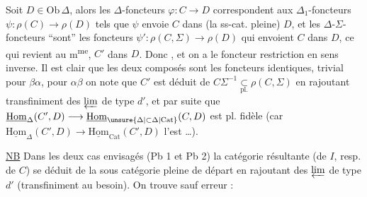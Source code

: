 
Soit $D\in\mathrm{Ob}\,\Delta$, alors les $\Delta$-foncteurs $\varphi:C\longrightarrow D$ correspondent aux $\Delta_1$-foncteurs $\psi:\rho(C)\longrightarrow\rho(D)$ tels que $\psi$ envoie $C$ dans (la ss-cat. pleine) $D$, et les $\Delta$-$\Sigma$-foncteurs ``sont''  les foncteurs $\psi':\rho(C,\Sigma)\longrightarrow\rho(D)$  qui envoient $C$ dans $D$,  ce qui revient au m\textsuperscript{me}, $C'$ dans $D$. Donc
, et on a le foncteur restriction en sens inverse. Il est clair que les deux composés sont \inserted{$\simeq$} les foncteurs identiques, trivial pour $\beta\alpha$, pour $\alpha\beta$ on note que  $C'$ est déduit de $C\Sigma^{-1}\underset{\mathrm{pl.}}{\subset}\rho(C,\Sigma)$ en rajoutant transfiniment des $\varprojlim$ de type $d'$, et par suite que $\underline{\mathrm{Hom}}_\Delta(C',D)\longrightarrow\underline{\mathrm{Hom}}_{\unsure{\Delta|\subset\Delta|\mathrm{Cat}}}(C,D)$ est pl. fidèle (car $\underline{\mathrm{Hom}}_\Delta(C',D)\longrightarrow\underline{\mathrm{Hom}}_{\mathrm{Cat}}(C',D)$ l'est \ldots).

\uline{NB} Dans les deux cas envisagés (Pb 1 et Pb 2) la catégorie résultante (de $I$, resp. de $C$) se déduit de la sous catégorie pleine de départ en rajoutant des $\varprojlim$ de type $d'$ (transfiniment au besoin). On trouve sauf erreur :

